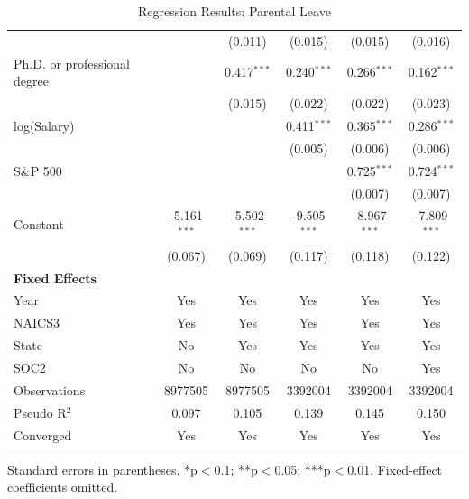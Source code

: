 \begin{table}[!htbp]
\begin{tabular}{lccccc}
 &  & (0.011) & (0.015) & (0.015) & (0.016) \\
Ph.D. or professional degree &  & 0.417$^{***}$ & 0.240$^{***}$ & 0.266$^{***}$ & 0.162$^{***}$ \\
 &  & (0.015) & (0.022) & (0.022) & (0.023) \\
log(Salary) &  &  & 0.411$^{***}$ & 0.365$^{***}$ & 0.286$^{***}$ \\
 &  &  & (0.005) & (0.006) & (0.006) \\
S\&P 500 &  &  &  & 0.725$^{***}$ & 0.724$^{***}$ \\
 &  &  &  & (0.007) & (0.007) \\
Constant & -5.161$^{***}$ & -5.502$^{***}$ & -9.505$^{***}$ & -8.967$^{***}$ & -7.809$^{***}$ \\
 & (0.067) & (0.069) & (0.117) & (0.118) & (0.122) \\
\midrule
\textbf{Fixed Effects} &  &  &  &  &  \\
Year & Yes & Yes & Yes & Yes & Yes \\
NAICS3 & Yes & Yes & Yes & Yes & Yes \\
State & No & Yes & Yes & Yes & Yes \\
SOC2 & No & No & No & No & Yes \\
Observations & 8977505 & 8977505 & 3392004 & 3392004 & 3392004 \\
Pseudo R$^2$ & 0.097 & 0.105 & 0.139 & 0.145 & 0.150 \\
Converged & Yes & Yes & Yes & Yes & Yes \\
\bottomrule
\end{tabular}
\caption{Regression Results: Parental Leave}
\par\smallskip\scriptsize Standard errors in parentheses. *p$<$0.1; **p$<$0.05; ***p$<$0.01. Fixed-effect coefficients omitted.
\end{table}